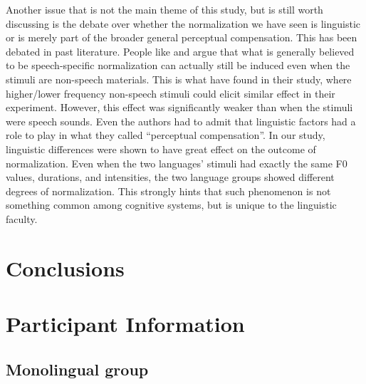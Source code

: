 \documentclass[12pt]{report}
\begin{document}
\begin{CJK}{UTF8}{bsmi}
Another issue that is not the main theme of this study, but is still worth discussing is the debate over whether the normalization we have seen is linguistic or is merely part of the broader general perceptual compensation. This has been debated in past literature. People like \cite{WatkinsMakin1994} and \cite{Zhangetal2022} argue that what is generally believed to be speech-specific normalization can actually still be induced even when the stimuli are non-speech materials. This is what \citeauthor{Zhangetal2022} have found in their study, where higher/lower frequency non-speech stimuli could elicit similar effect in their experiment. However, this effect was significantly weaker than when the stimuli were speech sounds. Even the authors had to admit that linguistic factors had a role to play in what they called ``perceptual compensation''. In our study, linguistic differences were shown to have great effect on the outcome of normalization. Even when the two languages' stimuli had exactly the same F0 values, durations, and intensities, the two language groups showed different degrees of normalization. This strongly hints that such phenomenon is not something common among cognitive systems, but is unique to the linguistic faculty.

\pagebreak
\chapter{Conclusions}


\pagebreak




\pagebreak
\appendix



\pagebreak
\chapter{Participant Information}\label{Appendix:ParticipantInfo}

\section{Monolingual group}


\end{CJK}
\end{document}

